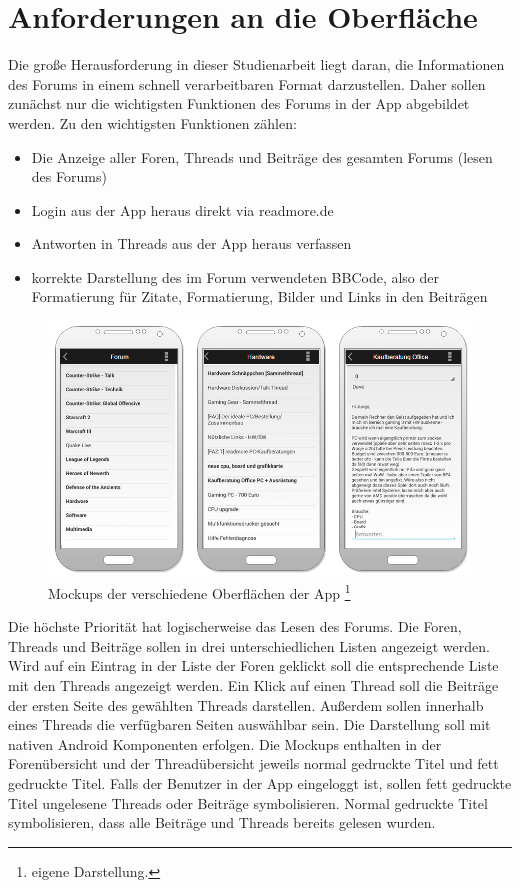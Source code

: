 \section{Anforderungen an die Oberfläche}
Die große Herausforderung in dieser Studienarbeit liegt daran, die Informationen
des Forums in einem schnell verarbeitbaren Format darzustellen. Daher sollen
zunächst nur die wichtigsten Funktionen des Forums in der App abgebildet werden.
Zu den wichtigsten Funktionen zählen:
\begin{itemize}
  \item Die Anzeige aller Foren, Threads und Beiträge des gesamten Forums
  (lesen des Forums)
  \item Login aus der App heraus direkt via readmore.de
  \item Antworten in Threads aus der App heraus verfassen
  \item korrekte Darstellung des im Forum verwendeten BBCode, also der
  Formatierung für Zitate, Formatierung, Bilder und Links in den Beiträgen
\end{itemize}
\begin{figure}[!htbp]
\centering
\includegraphics[width=\textwidth]{Bilder/mockups_oberflaeche.png}
\caption[Mockups der verschiedene Oberflächen der App]{Mockups der verschiedene Oberflächen der App
\protect\footnote{eigene Darstellung.} }
\label{dminfo}
\end{figure}
Die höchste Priorität hat logischerweise das Lesen des Forums. Die Foren,
Threads und Beiträge sollen in drei unterschiedlichen Listen angezeigt werden.
Wird auf ein Eintrag in der Liste der Foren geklickt soll die entsprechende
Liste mit den Threads angezeigt werden. Ein Klick auf einen Thread soll die
Beiträge der ersten Seite des gewählten Threads darstellen. Außerdem sollen
innerhalb eines Threads die verfügbaren Seiten auswählbar sein. Die Darstellung
soll mit nativen Android Komponenten erfolgen.
Die Mockups enthalten in der Forenübersicht und der Threadübersicht jeweils
normal gedruckte Titel und fett gedruckte Titel. Falls der Benutzer in der App
eingeloggt ist, sollen fett gedruckte Titel ungelesene Threads oder Beiträge
symbolisieren. Normal gedruckte Titel symbolisieren, dass alle Beiträge und
Threads bereits gelesen wurden.

